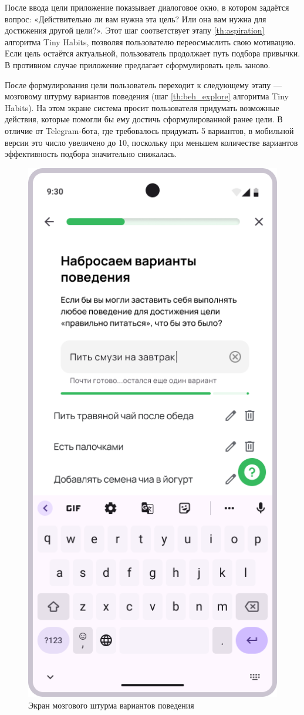\documentclass[pdflatex,sn-mathphys-num]{sn-jnl}%
\theoremstyle{thmstyleone}%
\theoremstyle{thmstyletwo}%
\theoremstyle{thmstylethree}%
\begin{document}
После ввода цели приложение показывает диалоговое окно, в котором задаётся вопрос: «Действительно ли вам нужна эта цель? Или она вам нужна для достижения другой цели?». Этот шаг соответствует этапу \ref{th:aspiration} алгоритма Tiny Habits, позволяя пользователю переосмыслить свою мотивацию. Если цель остаётся актуальной, пользователь продолжает путь подбора привычки. В противном случае приложение предлагает сформулировать цель заново.

После формулирования цели пользователь переходит к следующему этапу — мозговому штурму вариантов поведения (шаг \ref{th:beh_explore} алгоритма Tiny Habits). На этом экране система просит пользователя придумать возможные действия, которые помогли бы ему достичь сформулированной ранее цели. В отличие от Telegram-бота, где требовалось придумать 5 вариантов, в мобильной версии это число увеличено до 10, поскольку при меньшем количестве вариантов эффективность подбора значительно снижалась.

\begin{figure}
    \centering
    \includegraphics[width=0.5\linewidth]{figures/App/Onb_pick_2_1.png}
    \caption{Экран мозгового штурма вариантов поведения}
    \label{fig:Onb_pick_2_1}
\end{figure}
\end{document}
